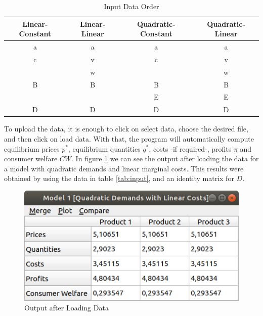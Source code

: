 \documentclass[12pt]{article}
\begin{document}
\begin{table}[H]
\begin{center}
\begin{tabular}{c|c|c|c} 
Linear-Constant&Linear-Linear&Quadratic-Constant&Quadratic-Linear\\
\hline
\hline
a&a&a&a\\
\hline
c&v&c&v\\
\hline
&w&&w\\
\hline
B&B&B&B\\
\hline
&&E&E\\
\hline
D&D&D&D\\
\hline
\end{tabular}
\caption{\label{tab:sample}Input Data Order}
\end{center}
\end{table}

To upload the data, it is enough to click on select data, choose the desired file, and then click on load data. With that, the program will automatically compute equilibrium prices $p^*$, equilibrium quantities $q^*$, costs -if required-, profits $\pi$ and consumer welfare $CW$. In figure \ref{first_results} we can see the output after loading the data for a model with quadratic demands and linear marginal costs. This results were obtained by using the data in table \ref{tab:input}, and an identity matrix for $D$.
\begin{figure}
\begin{center}
  \includegraphics[width=10 cm]{first_results}
\caption{\label{first_results} Output after Loading Data}
\end{center}
\end{figure}
\end{document}
